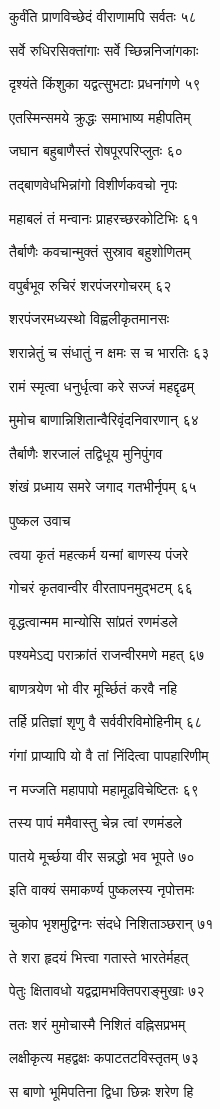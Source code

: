 कुर्वंति प्राणविच्छेदं वीराणामपि सर्वतः ५८

सर्वे रुधिरसिक्तांगाः सर्वे च्छिन्ननिजांगकाः

दृश्यंते किंशुका यद्वत्सुभटाः प्रधनांगणे ५९

एतस्मिन्समये क्रुद्धः समाभाष्य महीपतिम्

जघान बहुबाणैस्तं रोषपूरपरिप्लुतः ६०

तद्बाणवेधभिन्नांगो विशीर्णकवचो नृपः

महाबलं तं मन्वानः प्राहरच्छरकोटिभिः ६१

तैर्बाणैः कवचान्मुक्तं सुस्राव बहुशोणितम्

वपुर्बभूव रुचिरं शरपंजरगोचरम् ६२

शरपंजरमध्यस्थो विह्वलीकृतमानसः

शरान्नेतुं च संधातुं न क्षमः स च भारतिः ६३

रामं स्मृत्वा धनुर्धृत्वा करे सज्जं महद्दृढम्

मुमोच बाणान्निशितान्वैरिवृंदनिवारणान् ६४

तैर्बाणैः शरजालं तद्विधूय मुनिपुंगव

शंखं प्रध्माय समरे जगाद गतभीर्नृपम् ६५

पुष्कल उवाच

त्वया कृतं महत्कर्म यन्मां बाणस्य पंजरे

गोचरं कृतवान्वीर वीरतापनमुद्भटम् ६६

वृद्धत्वान्मम मान्योसि सांप्रतं रणमंडले

पश्यमेऽद्य पराक्रांतं राजन्वीरमणे महत् ६७

बाणत्रयेण भो वीर मूर्च्छितं करवै नहि

तर्हि प्रतिज्ञां शृणु वै सर्ववीरविमोहिनीम् ६८

गंगां प्राप्यापि यो वै तां निंदित्वा पापहारिणीम्

न मज्जति महापापो महामूढविचेष्टितः ६९

तस्य पापं ममैवास्तु चेन्न त्वां रणमंडले

पातये मूर्च्छया वीर सन्नद्धो भव भूपते ७०

इति वाक्यं समाकर्ण्य पुष्कलस्य नृपोत्तमः

चुकोप भृशमुद्विग्नः संदधे निशिताञ्छरान् ७१

ते शरा हृदयं भित्त्वा गतास्ते भारतेर्महत्

पेतुः क्षितावधो यद्वद्रामभक्तिपराङ्मुखाः ७२

ततः शरं मुमोचास्मै निशितं वह्निसप्रभम्

लक्षीकृत्य महद्वक्षः कपाटतटविस्तृतम् ७३

स बाणो भूमिपतिना द्विधा छिन्नः शरेण हि

